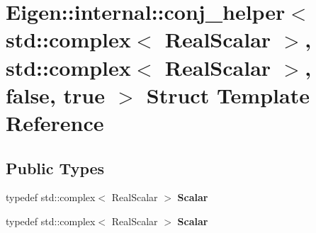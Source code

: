 \hypertarget{struct_eigen_1_1internal_1_1conj__helper_3_01std_1_1complex_3_01_real_scalar_01_4_00_01std_1_1co17cad1c9f1dd5f8fd2568a2fb541b29b}{}\section{Eigen\+:\+:internal\+:\+:conj\+\_\+helper$<$ std\+:\+:complex$<$ Real\+Scalar $>$, std\+:\+:complex$<$ Real\+Scalar $>$, false, true $>$ Struct Template Reference}
\label{struct_eigen_1_1internal_1_1conj__helper_3_01std_1_1complex_3_01_real_scalar_01_4_00_01std_1_1co17cad1c9f1dd5f8fd2568a2fb541b29b}
\subsection*{Public Types}
\begin{DoxyCompactItemize}
\item 
\mbox{\label{struct_eigen_1_1internal_1_1conj__helper_3_01std_1_1complex_3_01_real_scalar_01_4_00_01std_1_1co17cad1c9f1dd5f8fd2568a2fb541b29b_a5c8d5bd21d66221296357d96c071fdf5}} 
typedef std\+::complex$<$ Real\+Scalar $>$ {\bfseries Scalar}
\item 
\mbox{\label{struct_eigen_1_1internal_1_1conj__helper_3_01std_1_1complex_3_01_real_scalar_01_4_00_01std_1_1co17cad1c9f1dd5f8fd2568a2fb541b29b_a5c8d5bd21d66221296357d96c071fdf5}} 
typedef std\+::complex$<$ Real\+Scalar $>$ {\bfseries Scalar}
\end{DoxyCompactItemize}
